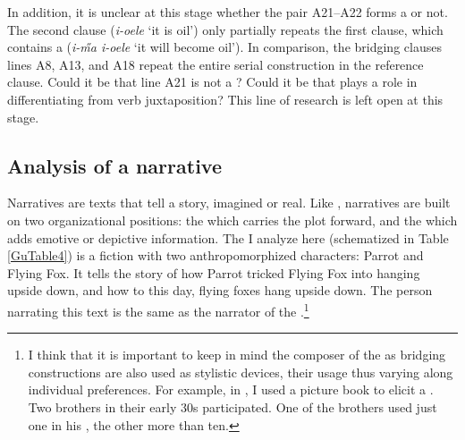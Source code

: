\documentclass[output=paper]{LSP/langsci}
\begin{document}
In addition, it is unclear at this stage whether the pair A21--A22 forms a  or not.  The second clause (\textit{i-oele} `it is oil') only partially repeats the first clause, which contains a  (\textit{i-\H{m}a i-oele} `it will become oil'). In comparison, the bridging clauses lines A8, A13, and A18 repeat the entire serial construction in the reference clause. Could it be that line A21 is not a ? Could it be that  plays a role in differentiating  from verb juxtaposition? This line of research is left open at this stage.

\subsection{Analysis of a narrative}
\label{Gunarrative}
Narratives are texts that tell a story, imagined or real. Like , narratives are built on two organizational positions: the  which carries the plot forward, and the  which adds emotive or depictive information. The  I analyze here (schematized in Table \ref{GuTable4}) is a fiction  with two anthropomorphized characters: Parrot and Flying Fox. It tells the story of how Parrot tricked Flying Fox into hanging upside down, and how to this day, flying foxes hang upside down. The person narrating this text is the same as the narrator of the .\footnote{I think that it is important to keep in mind the composer of the  \citep[][17]{longacre83} as bridging constructions are also used as stylistic devices, their usage thus varying along individual preferences. For example, in , I used a picture book to elicit a . Two brothers in their early 30s participated. One of the brothers used just one  in his , the other more than ten.}
\end{document}
